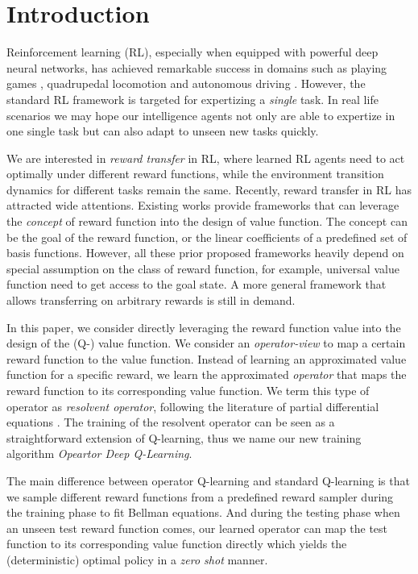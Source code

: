 \section{Introduction}
Reinforcement learning (RL), especially when equipped with powerful deep neural networks, has achieved remarkable success in domains such as playing games \citep[e.g.,]{mnih2015human,silver2018general, vinyals2019grandmaster}, quadrupedal locomotion \citep{haarnoja2018soft} and autonomous driving \citep{kendall2019learning, bellemare2020autonomous}.
However, the standard RL framework is targeted for expertizing a \textit{single} task.
In real life scenarios we may hope our intelligence agents not only are able to expertize in one single task but can also adapt to  unseen new tasks quickly.

We are interested in  \textit{reward transfer} in RL, 
where learned RL agents need to act optimally under different reward functions, 
while the environment transition dynamics for different tasks remain the same.
Recently, reward transfer in RL has attracted wide attentions.
Existing works \citep[e.g.,][]{schaul2015universal, barreto2017successor, barreto2018transfer, borsa2018universal, barreto2020fast} 
provide frameworks that can leverage the \textit{concept} of reward function into the design of value function.
The concept can be the goal of the reward function, or the linear coefficients of a predefined set of basis functions.
However, all these prior proposed frameworks heavily depend on special assumption on the class of reward function, 
for example, universal value function need to get access to the goal state.
A more general framework that allows transferring on arbitrary rewards is still in demand.



In this paper, we consider directly leveraging the reward function value into the design of the (Q-) value function.
We consider an \textit{operator-view} to map a certain reward function to the value function. 
Instead of learning an approximated value function for a specific reward, we learn the approximated \textit{operator} that maps the reward function to its corresponding value function. 
We term this type of operator as \textit{resolvent operator}, 
following the literature of partial differential equations \citep{yosida1971functional}.
The training of the resolvent operator can be seen as a straightforward extension of Q-learning, 
thus we name our new training algorithm \textit{Opeartor Deep Q-Learning}. 

The main difference between operator Q-learning and standard Q-learning is that we sample different reward functions from a predefined reward sampler during the training phase to fit Bellman equations.
And during the testing phase when an unseen test reward function comes, 
our learned operator can map the test function to its corresponding value function directly which yields the (deterministic) optimal policy in a \textit{zero shot} manner.

